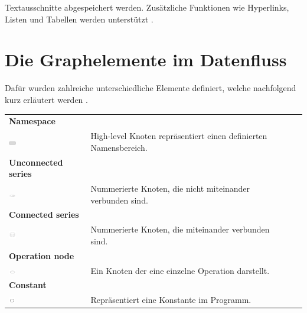 Textausschnitte abgespeichert werden. Zusätzliche Funktionen wie Hyperlinks, Listen und Tabellen werden unterstützt \cite{tensorboard.2017}.





\newpage

\section{Die Graphelemente im Datenfluss}

 Dafür wurden zahlreiche unterschiedliche Elemente definiert, welche nachfolgend kurz erläutert werden \cite{graph_viz}.
\\

\begin{tabular}{ p{4cm}p{10.8cm} ll }

\textbf{Namespace} \tabularnewline 
\includegraphics[width=0.1\textwidth]{images/Kapitel_3/namespace.png}
\label{fig:namespace}
 & High-level Knoten repräsentiert einen definierten Namensbereich.   \tabularnewline
  
\textbf{Unconnected series} \tabularnewline 
\includegraphics[width=0.1\textwidth]{images/Kapitel_3/Unconnected_series.png}
\label{fig:Unconnected_series}
 & Nummerierte Knoten, die nicht miteinander verbunden sind. \tabularnewline
  
\textbf{Connected series} \tabularnewline 
\includegraphics[width=0.1\textwidth]{images/Kapitel_3/Connected_series.png}
\label{fig:Connected_series}
 & Nummerierte Knoten, die miteinander verbunden sind. \tabularnewline 
 
\textbf{Operation node} \tabularnewline 
\includegraphics[width=0.1\textwidth]{images/Kapitel_3/Operation_node.png}
\label{fig:Operation_node}
 & Ein Knoten der eine einzelne Operation darstellt.  \tabularnewline 
 
\textbf{Constant} \tabularnewline 
\includegraphics[width=0.08\textwidth]{images/Kapitel_3/Constant.png}
\label{fig:Constant}
 & Repräsentiert eine Konstante im Programm.  \tabularnewline 


\end{tabular}

